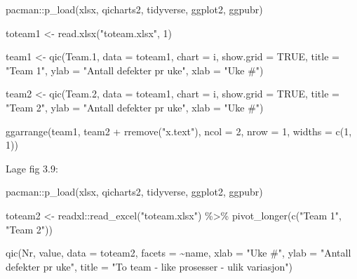 \documentclass[
]{book}
\newenvironment{Shaded}{\begin{snugshade}}{\end{snugshade}}
\newcommand{\AttributeTok}[1]{\textcolor[rgb]{0.77,0.63,0.00}{#1}}
\newcommand{\ConstantTok}[1]{\textcolor[rgb]{0.00,0.00,0.00}{#1}}
\newcommand{\DecValTok}[1]{\textcolor[rgb]{0.00,0.00,0.81}{#1}}
\newcommand{\FloatTok}[1]{\textcolor[rgb]{0.00,0.00,0.81}{#1}}
\newcommand{\FunctionTok}[1]{\textcolor[rgb]{0.00,0.00,0.00}{#1}}
\newcommand{\NormalTok}[1]{#1}
\newcommand{\OtherTok}[1]{\textcolor[rgb]{0.56,0.35,0.01}{#1}}
\newcommand{\SpecialCharTok}[1]{\textcolor[rgb]{0.00,0.00,0.00}{#1}}
\newcommand{\StringTok}[1]{\textcolor[rgb]{0.31,0.60,0.02}{#1}}
\begin{document}
\begin{Shaded}
\begin{Highlighting}[]
\NormalTok{pacman}\SpecialCharTok{::}\FunctionTok{p\_load}\NormalTok{(xlsx, qicharts2, tidyverse, ggplot2, ggpubr)}

\NormalTok{toteam1 }\OtherTok{\textless{}{-}} \FunctionTok{read.xlsx}\NormalTok{(}\StringTok{"toteam.xlsx"}\NormalTok{, }\DecValTok{1}\NormalTok{)}

\NormalTok{team1 }\OtherTok{\textless{}{-}} \FunctionTok{qic}\NormalTok{(Team}\FloatTok{.1}\NormalTok{,}
    \AttributeTok{data      =}\NormalTok{ toteam1, }
    \AttributeTok{chart     =} \StringTok{\textquotesingle{}i\textquotesingle{}}\NormalTok{,}
    \AttributeTok{show.grid =} \ConstantTok{TRUE}\NormalTok{,}
    \AttributeTok{title     =} \StringTok{"Team 1"}\NormalTok{,}
    \AttributeTok{ylab      =} \StringTok{"Antall defekter pr uke"}\NormalTok{,}
    \AttributeTok{xlab      =} \StringTok{"Uke \#"}\NormalTok{)}

\NormalTok{team2 }\OtherTok{\textless{}{-}} \FunctionTok{qic}\NormalTok{(Team}\FloatTok{.2}\NormalTok{,}
    \AttributeTok{data      =}\NormalTok{ toteam1, }
    \AttributeTok{chart     =} \StringTok{\textquotesingle{}i\textquotesingle{}}\NormalTok{,}
    \AttributeTok{show.grid =} \ConstantTok{TRUE}\NormalTok{,}
    \AttributeTok{title     =} \StringTok{"Team 2"}\NormalTok{,}
    \AttributeTok{ylab      =} \StringTok{"Antall defekter pr uke"}\NormalTok{,}
    \AttributeTok{xlab      =} \StringTok{"Uke \#"}\NormalTok{)}

\FunctionTok{ggarrange}\NormalTok{(team1, team2 }\SpecialCharTok{+} \FunctionTok{rremove}\NormalTok{(}\StringTok{"x.text"}\NormalTok{), }\AttributeTok{ncol =} \DecValTok{2}\NormalTok{, }\AttributeTok{nrow =} \DecValTok{1}\NormalTok{,  }\AttributeTok{widths =} \FunctionTok{c}\NormalTok{(}\DecValTok{1}\NormalTok{, }\DecValTok{1}\NormalTok{))}
\end{Highlighting}
\end{Shaded}

Lage fig 3.9:

\begin{Shaded}
\begin{Highlighting}[]
\NormalTok{pacman}\SpecialCharTok{::}\FunctionTok{p\_load}\NormalTok{(xlsx, qicharts2, tidyverse, ggplot2, ggpubr)}

\NormalTok{toteam2 }\OtherTok{\textless{}{-}}\NormalTok{ readxl}\SpecialCharTok{::}\FunctionTok{read\_excel}\NormalTok{(}\StringTok{"toteam.xlsx"}\NormalTok{) }\SpecialCharTok{\%\textgreater{}\%}
  \FunctionTok{pivot\_longer}\NormalTok{(}\FunctionTok{c}\NormalTok{(}\StringTok{"Team 1"}\NormalTok{, }\StringTok{"Team 2"}\NormalTok{))}

\FunctionTok{qic}\NormalTok{(Nr, value,}
    \AttributeTok{data =}\NormalTok{ toteam2,}
    \AttributeTok{facets =} \SpecialCharTok{\textasciitilde{}}\NormalTok{name,}
    \AttributeTok{xlab =} \StringTok{"Uke \#"}\NormalTok{,}
    \AttributeTok{ylab =} \StringTok{"Antall defekter pr uke"}\NormalTok{,}
    \AttributeTok{title =} \StringTok{"To team {-} like prosesser {-} ulik variasjon"}\NormalTok{)}
\end{Highlighting}
\end{Shaded}
\end{document}
